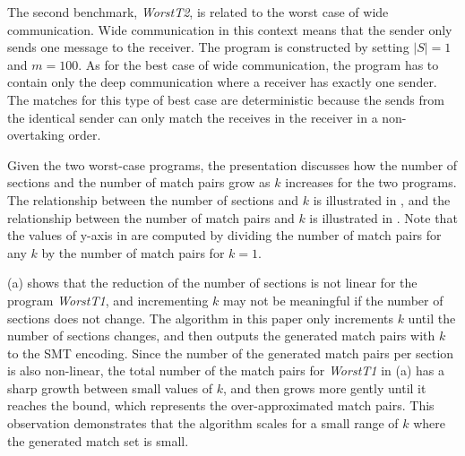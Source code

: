 

The second benchmark, \textit{WorstT2}, is related to the worst case of wide communication. Wide communication in this context means that the sender only sends one message to the receiver. The program is constructed by setting $|S|=1$ and $m=100$. As for the best case of wide communication, the program has to contain only the deep communication where a receiver has exactly one sender. The matches for this type of best case are deterministic because the sends from the identical sender can only match the receives in the receiver in a non-overtaking order. 

Given the two worst-case programs, the presentation discusses how the number of sections and the number of match pairs grow as $k$ increases for the two programs. 
The relationship between the number of sections and $k$ is illustrated in , and the relationship between the number of match pairs and $k$ is illustrated in .
Note that the values of y-axis in  are computed by dividing the number of match pairs for any $k$ by the number of match pairs for $k=1$.

 (a) shows that the reduction of the number of sections is not linear for the program \textit{WorstT1}, and incrementing $k$ may not be meaningful if the number of sections does not change. The algorithm in this paper only increments $k$ until the number of sections changes, and then outputs the generated match pairs with $k$ to the SMT encoding.
Since the number of the generated match pairs per section is also non-linear,
the total number of the match pairs for \textit{WorstT1} in  (a) has a sharp growth between small values of $k$, and then grows more gently until it reaches the bound, which represents the over-approximated match pairs. This observation demonstrates that the algorithm scales for a small range of $k$ where the generated match set is small.


